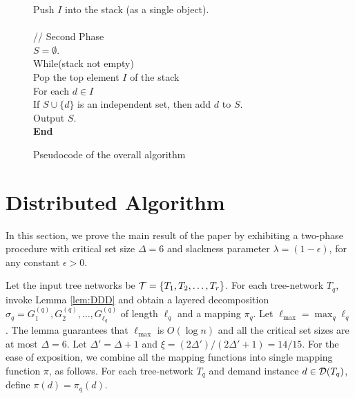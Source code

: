 \documentclass[11pt]{article}
\newcommand{\calT} {{\cal T}}
\newcommand{\calD} {{\cal D}}
\begin{document}
\begin{figure}[t!]
\begin{center}
\begin{boxedminipage}{\hsize}
\begin{tabbing}
\> \> \> \> Push $I$ into the stack (as a single object).\\
\>\\
\> // Second Phase\\
\> \> $S=\emptyset$.\\
\> \> While(stack not empty)\\
\> \> \> Pop the top element $I$ of the stack\\
\> \> \> For each $d\in I$\\
\> \> \> \> If $S\cup \{d\}$ is an independent set, then add $d$ to $S$.\\
\> Output $S$.\\
\textbf{End}
\end{tabbing}
\end{boxedminipage}
\end{center}
\caption{Pseudocode of the overall algorithm}
\label{fig:full-pseudo}
\end{figure}

\section{Distributed Algorithm}
\label{sec:distributed}
In this section, we prove the main result of the paper by exhibiting
a two-phase procedure with critical set size 
$\Delta=6$ and slackness parameter $\lambda=(1-\epsilon)$, for any constant $\epsilon>0$.

Let the input tree networks be $\calT=\{T_1, T_2, \ldots, T_r\}$.
For each tree-network $T_q$, invoke Lemma \ref{lem:DDD} and obtain a layered decomposition
$\sigma_q=G_1^{(q)}, G_2^{(q)}, \ldots, G_{\ell_q}^{(q)}$ of length $\ell_q$ and a mapping $\pi_q$.
Let $\ell_{\max} = \max_{q} \ell_q$. The lemma guarantees that $\ell_{\max}$ is $O(\log n)$
and all the critical set sizes are at most $\Delta=6$. 
Let $\Delta'=\Delta+1$ and $\xi=(2\Delta')/(2\Delta'+1)=14/15$.
For the ease of exposition,
we combine all the mapping functions into single mapping function $\pi$, as follows.
For each tree-network $T_q$ and demand instance $d\in \calD(T_q)$, define $\pi(d)=\pi_q(d)$.
\end{document}

